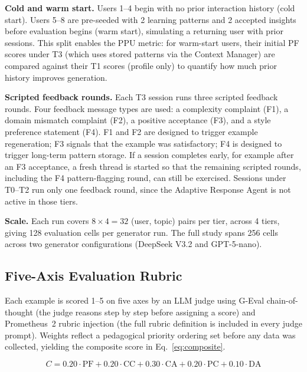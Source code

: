 \documentclass[conference]{IEEEtran}
\begin{document}
\textbf{Cold and warm start.} Users 1--4 begin with no prior interaction history (cold start). Users 5--8 are pre-seeded with 2 learning patterns and 2 accepted insights before evaluation begins (warm start), simulating a returning user with prior sessions. This split enables the PPU metric: for warm-start users, their initial PF scores under T3 (which uses stored patterns via the Context Manager) are compared against their T1 scores (profile only) to quantify how much prior history improves generation.

\textbf{Scripted feedback rounds.} Each T3 session runs three scripted feedback rounds. Four feedback message types are used: a complexity complaint (F1), a domain mismatch complaint (F2), a positive acceptance (F3), and a style preference statement (F4). F1 and F2 are designed to trigger example regeneration; F3 signals that the example was satisfactory; F4 is designed to trigger long-term pattern storage. If a session completes early, for example after an F3 acceptance, a fresh thread is started so that the remaining scripted rounds, including the F4 pattern-flagging round, can still be exercised. Sessions under T0--T2 run only one feedback round, since the Adaptive Response Agent is not active in those tiers.

\textbf{Scale.} Each run covers $8 \times 4 = 32$ (user, topic) pairs per tier, across 4 tiers, giving 128 evaluation cells per generator run. The full study spans 256 cells across two generator configurations (DeepSeek V3.2 and GPT-5-nano).

\subsection{Five-Axis Evaluation Rubric}

Each example is scored 1--5 on five axes by an LLM judge using G-Eval chain-of-thought \cite{b4} (the judge reasons step by step before assigning a score) and Prometheus~2 rubric injection \cite{b5} (the full rubric definition is included in every judge prompt). Weights reflect a pedagogical priority ordering set before any data was collected, yielding the composite score in Eq.~\ref{eq:composite}.

\begin{equation}
C = 0.20 \cdot \text{PF} + 0.20 \cdot \text{CC} + 0.30 \cdot \text{CA} + 0.20 \cdot \text{PC} + 0.10 \cdot \text{DA}
\label{eq:composite}
\end{equation}
\end{document}
